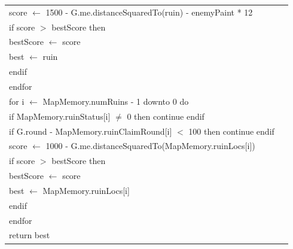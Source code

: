 \documentclass{article}
\newenvironment{pseudobox}
{
\centering
\begin{longtable}{|p{0.94\linewidth}|}
\hline
}
{
\\ \hline
\end{longtable}
\vspace{0.05cm}
}
\begin{document}
\begin{pseudobox}
\hspace*{2em} score $\leftarrow$ 1500 - G.me.distanceSquaredTo(ruin) - enemyPaint * 12 \\

\hspace*{2em} if score $>$ bestScore then \\
\hspace*{3em} bestScore $\leftarrow$ score \\
\hspace*{3em} best $\leftarrow$ ruin \\
\hspace*{2em} endif \\
\hspace*{1em} endfor \\

\hspace*{1em} for i $\leftarrow$ MapMemory.numRuins - 1 downto 0 do \\
\hspace*{2em} if MapMemory.ruinStatus[i] $\neq$ 0 then continue endif \\
\hspace*{2em} if G.round - MapMemory.ruinClaimRound[i] $<$ 100 then continue endif \\

\hspace*{2em} score $\leftarrow$ 1000 - G.me.distanceSquaredTo(MapMemory.ruinLocs[i]) \\

\hspace*{2em} if score $>$ bestScore then \\
\hspace*{3em} bestScore $\leftarrow$ score \\
\hspace*{3em} best $\leftarrow$ MapMemory.ruinLocs[i] \\
\hspace*{2em} endif \\
\hspace*{1em} endfor \\

\hspace*{1em} return best
\end{pseudobox}
\end{document}
